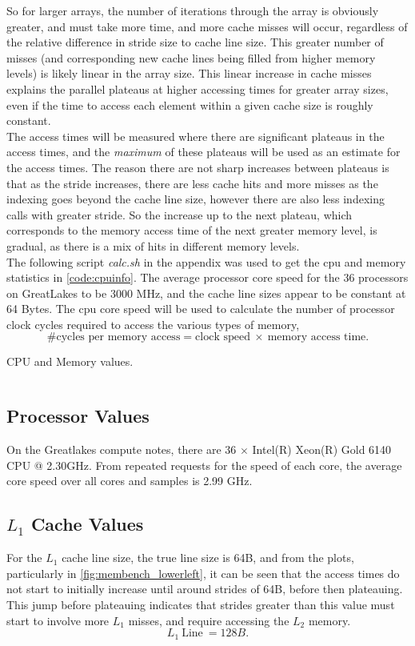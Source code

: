 \documentclass[letterpaper]{article}
\newenvironment{longlisting}{\captionsetup{type=listing}}{}
\newcommand{\code}[4]{
\begin{longlisting}
    \caption{#3}
    \inputminted[linenos]{#1}{#2}
    \label{code:#4}
\end{longlisting}
}
\begin{document}
So for larger arrays, the number of iterations through the array is obviously greater, and must take more time, and more cache misses will occur, regardless of the relative difference in stride size to cache line size. This greater number of misses (and corresponding new cache lines being filled from higher memory levels) is likely linear in the array size. This linear increase in cache misses explains the parallel plateaus at higher accessing times for greater array sizes, even if the time to access each element within a given cache size is roughly constant. \\

The access times will be measured where there are significant plateaus in the access times, and the \textit{maximum} of these plateaus will be used as an estimate for the access times. The reason there are not sharp increases between plateaus is that as the stride increases, there are less cache hits and more misses as the indexing goes beyond the cache line size, however there are also less indexing calls with greater stride. So the increase up to the next plateau, which corresponds to the memory access time of the next greater memory level, is gradual, as there is a mix of hits in different memory levels. \\

The following script \textit{calc.sh} in the appendix was used to get the cpu and memory statistics in \cref{code:cpuinfo}. The average processor core speed for the $36$ processors on GreatLakes to be 3000 MHz, and the cache line sizes appear to be constant at 64 Bytes. The cpu core speed will be used to calculate the number of processor clock cycles required to access the various types of memory, 
$$\textrm{\# cycles per memory access} = \textrm{clock speed}~\times~\textrm{memory access time}.$$

\code{text}{figures/cpuinfo.txt}{CPU and Memory values.}{cpuinfo}

\subsection{Processor Values}
On the Greatlakes compute notes, there are 36 $\times$ Intel(R) Xeon(R) Gold 6140 CPU @ 2.30GHz. From repeated requests for the speed of each core, the average core speed over all cores and samples is 2.99 GHz.

\subsection{$L_1$ Cache Values}
For the $L_1$ cache line size, the true line size is 64B, and from the plots, particularly in \cref{fig:membench_lowerleft}, it can be seen that the access times do not start to initially increase until around strides of 64B, before then plateauing. This jump before plateauing indicates that strides greater than this value must start to involve more $L_1$ misses, and require accessing the $L_2$ memory.
$$ L_1 ~\textrm{Line}~ = 128B. $$
\end{document}
